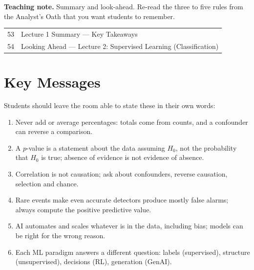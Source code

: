 \documentclass[11pt]{article}
\begin{document}
\textbf{Teaching note.} Summary and look-ahead. Re-read the three to five rules from the Analyst's Oath that you want students to remember.

\begin{center}\small\renewcommand{\arraystretch}{1.1}\begin{tabularx}{\textwidth}{@{}r X@{}}53 & Lecture 1 Summary --- Key Takeaways\\
54 & Looking Ahead --- Lecture 2: Supervised Learning (Classification)\\\end{tabularx}\end{center}

\section{Key Messages}Students should leave the room able to state these in their own words:\begin{keypoint}\begin{enumerate}\item Never add or average percentages: totals come from counts, and a confounder can reverse a comparison.\item A $p$-value is a statement about the data assuming $H_0$, not the probability that $H_0$ is true; absence of evidence is not evidence of absence.\item Correlation is not causation; ask about confounders, reverse causation, selection and chance.\item Rare events make even accurate detectors produce mostly false alarms; always compute the positive predictive value.\item AI automates and scales whatever is in the data, including bias; models can be right for the wrong reason.\item Each ML paradigm answers a different question: labels (supervised), structure (unsupervised), decisions (RL), generation (GenAI).\end{enumerate}\end{keypoint}
\end{document}
